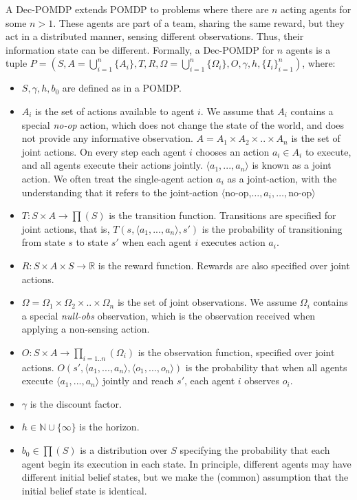 \documentclass[letterpaper]{article} %
\begin{document}
A Dec-POMDP extends POMDP to problems where there are $n$ acting agents for some $n>1$. 
These agents are part of a team, sharing the same reward, but they act in a distributed manner,
sensing different observations. Thus, their information state can be different. 
Formally, a Dec-POMDP for $n$ agents is a tuple  $P=(S, A=\bigcup_{i=1}^{n}{\{A_i\}}, T, R, \Omega=\bigcup_{i=1}^{n}{\{\Omega_i\}},  O, \gamma, h, {\{I_i\}}_{i=1}^{n})$, where:
\begin{itemize}
\item
$S,\gamma,h,b_0$ are defined as in a POMDP.
\item
$A_i$ is the set of actions available to agent $i$. We assume that $A_i$ contains a special {\em no-op} action, which does not change the state of the world, and does not provide any informative observation. 
$A=A_1 \times A_2 \times .. \times A_n$ is the set of joint actions. On every step each agent $i$ chooses an action $a_i \in A_i$ to execute, and all agents execute their actions jointly. $\langle a_1,...,a_n \rangle$ is known as a joint action. We often treat the
single-agent action $a_i$ as a joint-action, with the understanding that it refers to the joint-action $\langle$no-op,$\ldots,a_i,\ldots,$no-op$\rangle$
\item
$T:S \times A \rightarrow \prod(S)$  is the transition function. Transitions are specified for joint actions, that is, $T(s, \langle a_1,...,a_n \rangle, s')$ is the probability of transitioning from state $s$ to state $s'$ when each agent $i$ executes action $a_i$.
\item
$R:S \times A \times S \rightarrow \mathbb{R}$  is the reward function. Rewards are also specified over joint actions.
\item
$\Omega = \Omega_1 \times \Omega_2 \times .. \times \Omega_n$ is the set of joint observations. We assume $\Omega_i$ contains a special {\em null-obs} observation, which is the observation received when applying a non-sensing action.
\item
$O:S \times A \rightarrow \prod_{i=1..n}(\Omega_i)$  is the observation function, specified over joint actions. $O(s',\langle a_1,...,a_n \rangle,\langle o_1,...,o_n \rangle)$ is the probability that when all agents execute $\langle a_1,...,a_n \rangle$ jointly and reach $s'$, each agent $i$ observes $o_i$.
\item
$\gamma$  is the discount factor.
\item
$h\in\mathbb{N}\cup\{\infty\}$ is the horizon.
\item
$b_0 \in \prod(S)$ is a distribution over $S$ specifying the probability that each agent begin its execution in each state. In principle, different agents may have different initial belief states, but
we make the (common) assumption that the initial belief state is identical. 
\end{itemize}
\end{document}
